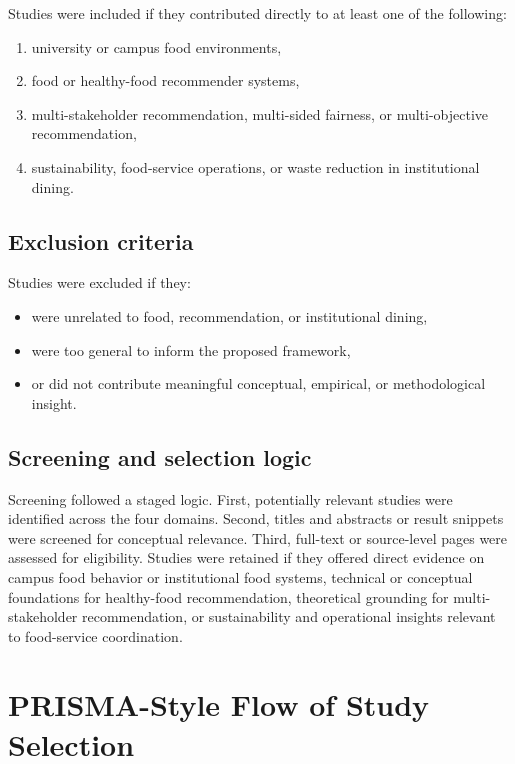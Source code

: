 \documentclass[
  letterpaper,
  DIV=11,
  numbers=noendperiod]{scrartcl}
\providecommand{\tightlist}{%
  \setlength{\itemsep}{0pt}\setlength{\parskip}{0pt}}
\begin{document}
Studies were included if they contributed directly to at least one of
the following:

\begin{enumerate}
\def\labelenumi{\arabic{enumi}.}
\tightlist
\item
  university or campus food environments,
\item
  food or healthy-food recommender systems,
\item
  multi-stakeholder recommendation, multi-sided fairness, or
  multi-objective recommendation,
\item
  sustainability, food-service operations, or waste reduction in
  institutional dining.
\end{enumerate}

\subsection{Exclusion criteria}\label{exclusion-criteria}

Studies were excluded if they:

\begin{itemize}
\tightlist
\item
  were unrelated to food, recommendation, or institutional dining,
\item
  were too general to inform the proposed framework,
\item
  or did not contribute meaningful conceptual, empirical, or
  methodological insight.
\end{itemize}

\subsection{Screening and selection
logic}\label{screening-and-selection-logic}

Screening followed a staged logic. First, potentially relevant studies
were identified across the four domains. Second, titles and abstracts or
result snippets were screened for conceptual relevance. Third, full-text
or source-level pages were assessed for eligibility. Studies were
retained if they offered direct evidence on campus food behavior or
institutional food systems, technical or conceptual foundations for
healthy-food recommendation, theoretical grounding for multi-stakeholder
recommendation, or sustainability and operational insights relevant to
food-service coordination.

\section{PRISMA-Style Flow of Study
Selection}\label{prisma-style-flow-of-study-selection}
\end{document}
